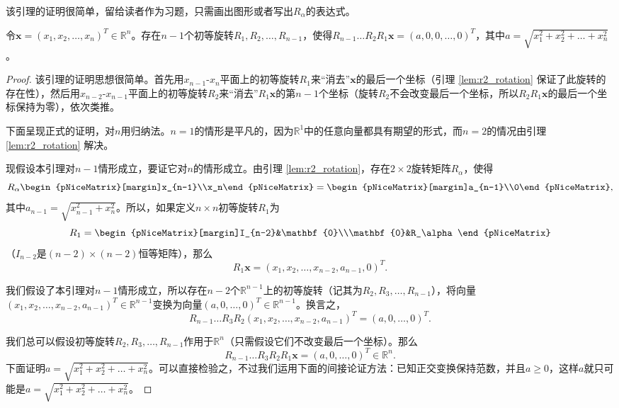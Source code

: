 该引理的证明很简单，留给读者作为习题，只需画出图形或者写出$R_\alpha$的表达式。

\begin{lemma}\label{lem:rn_rotation}
    令$\mathbf{x}=(x_1,x_2,\dots,x_n)^T\in\mathbb{R}^n$。存在$n-1$个初等旋转\linebreak $R_1,R_2,\dots,R_{n-1}$，使得$R_{n-1}\ldots R_2R_1\mathbf{x}=(a,0,0,\dots,0)^T$，其中$a=\sqrt{x_1^2+x_2^2+\dots+x_n^2}$。
\end{lemma}

\begin{proof}
    该引理的证明思想很简单。首先用$x_{n-1}$-$x_n$平面上的初等旋转$R_1$来“消去”$\mathbf{x}$的最后一个坐标（引理 \ref{lem:r2_rotation} 保证了此旋转的存在性），然后用$x_{n-2}$-$x_{n-1}$平面上的初等旋转$R_2$来“消去”$R_1\mathbf{x}$的第$n-1$个坐标（旋转$R_2$不会改变最后一个坐标，所以$R_2R_1\mathbf{x}$的最后一个坐标保持为零），依次类推。

    下面呈现正式的证明，对$n$用归纳法。$n=1$的情形是平凡的，因为$\mathbb{R}^1$中的任意向量都具有期望的形式，而$n=2$的情况由引理 \ref{lem:r2_rotation} 解决。

    现假设本引理对$n-1$情形成立，要证它对$n$的情形成立。由引理 \ref{lem:r2_rotation}，存在$2\times 2$旋转矩阵$R_\alpha$，使得
    \[R_\alpha\begin{pNiceMatrix}[margin]x_{n-1}\\x_n\end{pNiceMatrix}=\begin{pNiceMatrix}[margin]a_{n-1}\\0\end{pNiceMatrix},\]
    其中$a_{n-1}=\sqrt{x_{n-1}^2+x_n^2}$。所以，如果定义$n\times n$初等旋转$R_1$为
    \[R_1=\begin{pNiceMatrix}[margin]I_{n-2}&\mathbf{0}\\\mathbf{0}&R_\alpha\end{pNiceMatrix}\]
    （$I_{n-2}$是$(n-2)\times (n-2)$恒等矩阵），那么
    \[R_1\mathbf{x}=(x_1,x_2,\dots,x_{n-2},a_{n-1},0)^T.\]

    我们假设了本引理对$n-1$情形成立，所以存在$n-2$个$\mathbb{R}^{n-1}$上的初等旋转（记其为$R_2,R_3,\dots,R_{n-1}$），将向量$(x_1,x_2,\dots,x_{n-2},a_{n-1})^T\in\mathbb{R}^{n-1}$变换为向量$(a,0,\dots,0)^T\in\mathbb{R}^{n-1}$。换言之，
    \[R_{n-1}\dots R_3R_2(x_1,x_2,\dots,x_{n-2},a_{n-1})^T=(a,0,\dots,0)^T.\]

    我们总可以假设初等旋转$R_2,R_3,\dots,R_{n-1}$作用于$\mathbb{R}^n$（只需假设它们不改变最后一个坐标）。那么
    \[R_{n-1}\dots R_3R_2R_1\mathbf{x}=(a,0,\dots,0)^T\in\mathbb{R}^n.\]
    下面证明$a=\sqrt{x_1^2+x_2^2+\dots+x_n^2}$。可以直接检验之，不过我们运用下面的间接论证方法：已知正交变换保持范数，并且$a\ge 0$，这样$a$就只可能是$a=\sqrt{x_1^2+x_2^2+\dots+x_n^2}$。
\end{proof}

